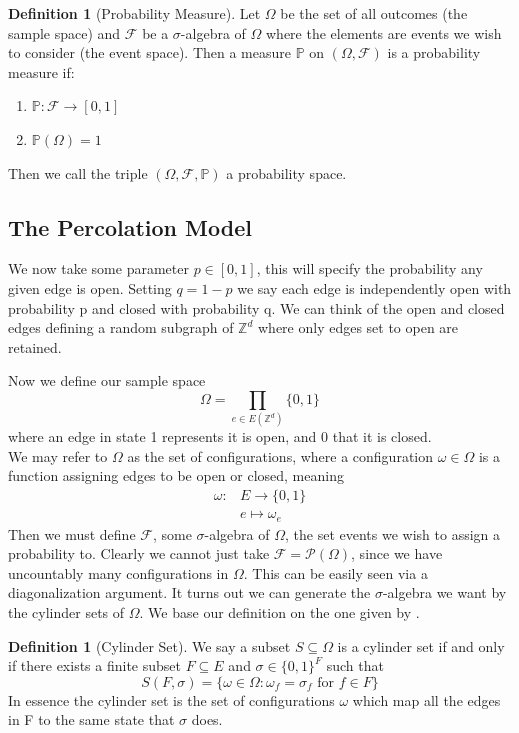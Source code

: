 \documentclass[a4paper,11pt]{article}
\theoremstyle{definition}
\newtheorem{definition}[theorem]{Definition}
\newcommand{\ints}{\mathbb{Z}}
\newcommand{\sigalg}{$\sigma$-algebra }
\begin{document}
\begin{definition}[Probability Measure]
	Let $\Omega$ be the set of all outcomes (the sample space) and $\mathcal{F}$ be a \sigalg of $\Omega$ where the elements are events we wish to consider (the event space). Then a measure $\mathbb{P}$ on $(\Omega,\mathcal{F})$ is a probability measure if:
	\begin{enumerate}
		\item $\mathbb{P}: \mathcal{F} \rightarrow [0,1]$
		\item $\mathbb{P}(\Omega) = 1$
	\end{enumerate}
	Then we call the triple $(\Omega,\mathcal{F},\mathbb{P})$ a probability space.
	
\end{definition}

\subsection{The Percolation Model}

We now take some parameter $p \in [0,1]$, this will specify the probability any given edge is open. 
Setting $q = 1-p$ we say each edge is independently open with probability p and closed with probability q.
We can think of the open and closed edges defining a random subgraph of $\ints^d$ where only edges set to open are retained.

Now we define our sample space $$\Omega = \prod_{e \in E(\ints^d)} \{0,1\}$$ where an edge in state 1 represents it is open, and 0 that it is closed.\\
We may refer to $\Omega$ as the set of configurations, where a configuration $\omega \in \Omega$ is a function assigning edges to be open or closed, meaning 
\begin{align*}
	\omega:&E \to \{0,1\}\\
	&e \mapsto \omega_e
\end{align*}
Then we must define $\mathcal{F}$, some \sigalg of $\Omega$, the set events we wish to assign a probability to. 
Clearly we cannot just take $\mathcal{F} = \mathcal{P}(\Omega)$, since we have uncountably many configurations in $\Omega$. 
This can be easily seen via a diagonalization argument. 
It turns out we can generate the \sigalg we want by the cylinder sets of $\Omega$. We base our definition on the one given by \cite{bollo2006}.

\begin{definition}[Cylinder Set]
	We say a subset $S \subseteq \Omega$ is a cylinder set if and only if there exists a finite subset $F \subseteq E$ and $\sigma \in \{0,1\}^F$ such that 
	$$S(F,\sigma) = \{\omega \in \Omega: \omega_f = \sigma_f \text{ for }f \in F\}$$
	In essence the cylinder set is the set of configurations $\omega$ which map all the edges in F to the same state that $\sigma$ does.
\end{definition}
\end{document}
